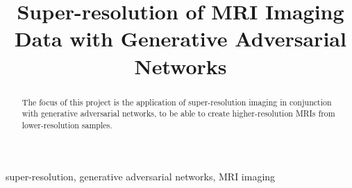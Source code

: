 \documentclass[conference]{IEEEtran}
\begin{document}
\title{Super-resolution of MRI Imaging Data with Generative Adversarial Networks
\\
}
\author{
\and
{}
\and
{}
}

\maketitle
\thispagestyle{plain}


\begin{abstract}
The focus of this project is the application of super-resolution imaging in conjunction with generative adversarial networks, to be able to create higher-resolution MRIs from lower-resolution samples.
\end{abstract}

\begin{IEEEkeywords}
super-resolution, generative adversarial networks, MRI imaging
\end{IEEEkeywords}
\end{document}
